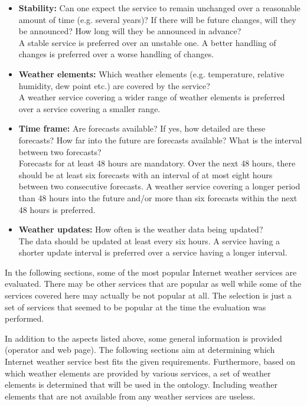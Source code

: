 \begin{itemize}
  \item \textbf{Stability:} Can one expect the service to remain unchanged over a reasonable amount of time (e.g. several years)? If there will be future changes, will they be announced? How long will they be announced in advance?\\
  A stable service is preferred over an unstable one. A better handling of changes is preferred over a worse handling of changes.
  
  \item \textbf{Weather elements:} Which weather elements (e.g. temperature, relative humidity, dew point etc.) are covered by the service?\\
  A weather service covering a wider range of weather elements is preferred over a service covering a smaller range.
  
  \item \textbf{Time frame:} Are forecasts available? If yes, how detailed are these forecasts? How far into the future are forecasts available? What is the interval between two forecasts?\\
  Forecasts for at least 48 hours are mandatory. Over the next 48 hours, there should be at least six forecasts with an interval of at most eight hours between two consecutive forecasts. A weather service covering a longer period than 48 hours into the future and/or more than six forecasts within the next 48 hours is preferred.
  
  \item \textbf{Weather updates:} How often is the weather data being updated?\\
  The data should be updated at least every six hours. A service having a shorter update interval is preferred over a service having a longer interval.
\end{itemize}

In the following sections, some of the most popular Internet weather services are evaluated. There may be other services that are popular as well while some of the services covered here may actually be not popular at all. The selection is just a set of services that seemed to be popular at the time the evaluation was performed.

In addition to the aspects listed above, some general information is provided (operator and web page). The following sections aim at determining which Internet weather service best fits the given requirements. Furthermore, based on which weather elements are provided by various services, a set of weather elements is determined that will be used in the ontology. Including weather elements that are not available from any weather services are useless.

